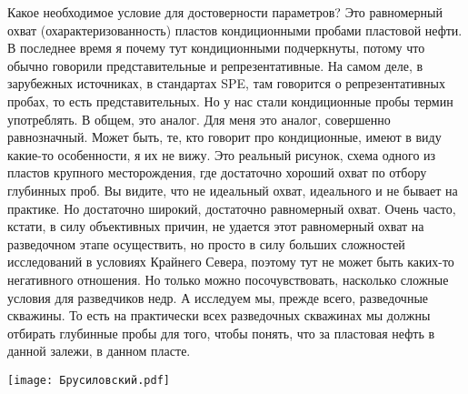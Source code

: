 \documentclass[main.tex]{subfiles}
\begin{document}
Какое необходимое условие для достоверности параметров?
Это равномерный охват (охарактеризованность) пластов кондиционными пробами пластовой нефти.
В последнее время я почему тут кондиционными подчеркнуты, потому что обычно говорили представительные и репрезентативные.
На самом деле, в зарубежных источниках, в стандартах SPE, там говорится о репрезентативных пробах, то есть представительных.
Но у нас стали кондиционные пробы термин употреблять.
В общем, это аналог.
Для меня это аналог, совершенно равнозначный.
Может быть, те, кто говорит про кондиционные, имеют в виду какие-то особенности, я их не вижу.
Это реальный рисунок, схема одного из пластов крупного месторождения, где достаточно хороший охват по отбору глубинных проб.
Вы видите, что не идеальный охват, идеального и не бывает на практике.
Но достаточно широкий, достаточно равномерный охват.
Очень часто, кстати, в силу объективных причин, не удается этот равномерный охват на разведочном этапе осуществить, но просто в силу больших сложностей исследований в условиях Крайнего Севера, поэтому тут не может быть каких-то негативного отношения.
Но только можно посочувствовать, насколько сложные условия для разведчиков недр.
А исследуем мы, прежде всего, разведочные скважины.
То есть на практически всех разведочных скважинах мы должны отбирать глубинные пробы для того, чтобы понять, что за пластовая нефть в данной залежи, в данном пласте.

\begin{center}
\texttt{[image: Брусиловский.pdf]}
\end{center}
\end{document}
